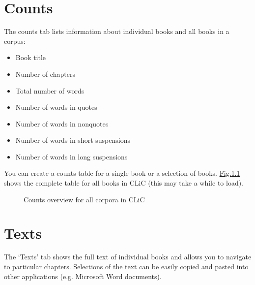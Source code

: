 \documentclass[letterpaper,10pt,english]{sphinxmanual}
\begin{document}
\chapter{Counts}
\label{\detokenize{clicanalysis/counts:counts}}\label{\detokenize{clicanalysis/counts:id1}}\label{\detokenize{clicanalysis/counts::doc}}
\sphinxAtStartPar
The counts tab lists information about individual books and all books in
a corpus:
\begin{itemize}
\item {} 
\sphinxAtStartPar
Book title

\item {} 
\sphinxAtStartPar
Number of chapters

\item {} 
\sphinxAtStartPar
Total number of words

\item {} 
\sphinxAtStartPar
Number of words in quotes

\item {} 
\sphinxAtStartPar
Number of words in non\sphinxhyphen{}quotes

\item {} 
\sphinxAtStartPar
Number of words in short suspensions

\item {} 
\sphinxAtStartPar
Number of words in long suspensions

\end{itemize}

\sphinxAtStartPar
You can create a counts table for a single book or a selection of books.
\hyperref[\detokenize{clicanalysis/counts:figure-analysis-counts}]{Fig.\@ \ref{\detokenize{clicanalysis/counts:figure-analysis-counts}}} shows the complete table for all books
in CLiC (this may take a while to load).

\begin{figure}[htbp]
\centering
\capstart

\noindent{}
\caption{Counts overview for all corpora in CLiC}\label{\detokenize{clicanalysis/counts:id2}}\label{\detokenize{clicanalysis/counts:figure-analysis-counts}}\end{figure}

\sphinxstepscope


\chapter{Texts}
\label{\detokenize{clicanalysis/texts:texts}}\label{\detokenize{clicanalysis/texts:id1}}\label{\detokenize{clicanalysis/texts::doc}}
\sphinxAtStartPar
The ‘Texts’ tab shows the full text of individual books and allows you
to navigate to particular chapters. Selections of the text can be easily
copied and pasted into other applications (e.g. Microsoft Word
documents).
\end{document}

